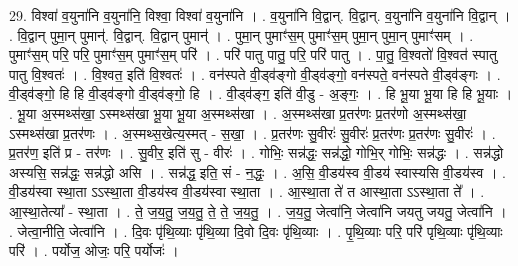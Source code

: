 \documentclass[17pt]{extarticle}
\begin{document}
29. विश्वा॑ व॒युना॑नि व॒युना॑नि॒ विश्वा॒ विश्वा॑ व॒युना॑नि । . व॒युना॑नि वि॒द्वान्. वि॒द्वान्. व॒युना॑नि व॒युना॑नि वि॒द्वान् । . वि॒द्वान् पुमा॒न् पुमान्॑. वि॒द्वान्. वि॒द्वान् पुमान्॑ । . पुमा॒न् पुमाꣳ॑स॒म् पुमाꣳ॑स॒म् पुमा॒न् पुमा॒न् पुमाꣳ॑सम् । . पुमाꣳ॑स॒म् परि॒ परि॒ पुमाꣳ॑स॒म् पुमाꣳ॑स॒म् परि॑ । . परि॑ पातु पातु॒ परि॒ परि॑ पातु । . पा॒तु॒ वि॒श्वतो॑ वि॒श्वत॑ स्पातु पातु वि॒श्वतः॑ । . वि॒श्वत॒ इति॑ वि॒श्वतः॑ । . वन॑स्पते वी॒ड्व॑ङ्गो वी॒ड्व॑ङ्गो॒ वन॑स्पते॒ वन॑स्पते वी॒ड्व॑ङ्गः । . वी॒ड्व॑ङ्गो॒ हि हि वी॒ड्व॑ङ्गो वी॒ड्व॑ङ्गो॒ हि । . वी॒ड्व॑ङ्ग॒ इति॑ वी॒डु - अ॒ङ्गः॒ । . हि भू॒या भू॒या हि हि भू॒याः । . भू॒या अ॒स्मथ्स॑खा॒ ऽस्मथ्स॑खा भू॒या भू॒या अ॒स्मथ्स॑खा । . अ॒स्मथ्स॑खा प्र॒तर॑णः प्र॒तर॑णो अ॒स्मथ्स॑खा॒ ऽस्मथ्स॑खा प्र॒तर॑णः । . अ॒स्मथ्स॒खेत्य॒स्मत् - स॒खा॒ । . प्र॒तर॑णः सु॒वीरः॑ सु॒वीरः॑ प्र॒तर॑णः प्र॒तर॑णः सु॒वीरः॑ । . प्र॒तर॑ण॒ इति॑ प्र - तर॑णः । . सु॒वीर॒ इति॑ सु - वीरः॑ । . गोभिः॒ सन्न॑द्धः॒ सन्न॑द्धो॒ गोभि॒र् गोभिः॒ सन्न॑द्धः । . सन्न॑द्धो अस्यसि॒ सन्न॑द्धः॒ सन्न॑द्धो असि । . सन्न॑द्ध॒ इति॒ सं - न॒द्धः॒ । . अ॒सि॒ वी॒डय॑स्व वी॒डय॑ स्वास्यसि वी॒डय॑स्व । . वी॒डय॑स्वा स्था॒ता ऽऽस्था॒ता वी॒डय॑स्व वी॒डय॑स्वा स्था॒ता । . आ॒स्था॒ता ते॑ त आस्था॒ता ऽऽस्था॒ता ते᳚ । . आ॒स्था॒तेत्या᳚ - स्था॒ता । . ते॒ ज॒य॒तु॒ ज॒य॒तु॒ ते॒ ते॒ ज॒य॒तु॒ । . ज॒य॒तु॒ जेत्वा॑नि॒ जेत्वा॑नि जयतु जयतु॒ जेत्वा॑नि । . जेत्वा॒नीति॒ जेत्वा॑नि । . दि॒वः पृ॑थि॒व्याः पृ॑थि॒व्या दि॒वो दि॒वः पृ॑थि॒व्याः । . पृ॒थि॒व्याः परि॒ परि॑ पृथि॒व्याः पृ॑थि॒व्याः परि॑ । . पर्योज॒ ओजः॒ परि॒ पर्योजः॑ । \newline
\end{document}
